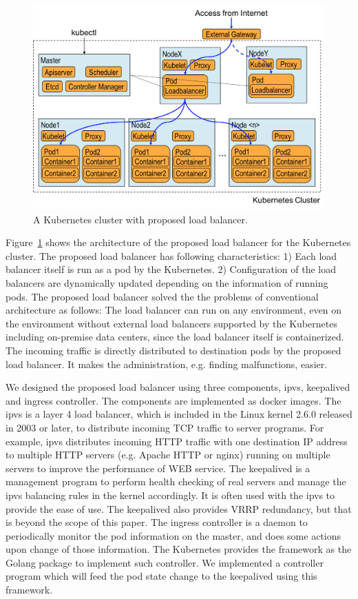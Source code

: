 \begin{figure}
\includegraphics[width=\columnwidth]{Figs/K8sProposed}
\caption{A Kubernetes cluster with proposed load balancer.}
\label{fig:K8sProposed}
\end{figure}

Figure~\ref{fig:K8sProposed} shows the architecture of the proposed load balancer for the Kubernetes cluster. 
The proposed load balancer has following characteristics:
1) Each load balancer itself is run as a pod by the Kubernetes. 
2) Configuration of the load balancers are dynamically updated depending on the information of running pods.
The proposed load balancer solved the the problems of conventional architecture as follows:
The load balancer can run on any environment, even on the environment without external load balancers supported by the Kubernetes including on-premise data centers, since the load balancer itself is containerized. The incoming traffic is directly distributed to destination pods by the proposed load balancer. It makes the administration, e.g. finding malfunctions, easier.

We designed the proposed load balancer using three components, ipvs, keepalived and ingress controller. The components are implemented as docker images.
The ipvs is a layer 4 load balancer, which is included in the Linux kernel 2.6.0 released in 2003 or later, to distribute incoming TCP traffic to server programs. For example, ipvs distributes incoming HTTP traffic with one destination IP address to multiple HTTP servers (e.g. Apache HTTP or nginx) running on multiple servers to improve the performance of WEB service.
The keepalived is a management program to perform health checking of real servers
and manage the ipvs balancing rules in the kernel accordingly.
It is often used with the ipvs to provide the ease of use.
The keepalived also provides VRRP\cite{hinden2004virtual} redundancy, but that is beyond the scope of this paper.
The ingress controller is a daemon to periodically monitor the pod information on the master, 
and does some actions upon change of those information.
The Kubernetes provides the framework as the Golang package to implement such controller. 
We implemented a controller program which will feed the pod state change to the keepalived 
using this framework. 

